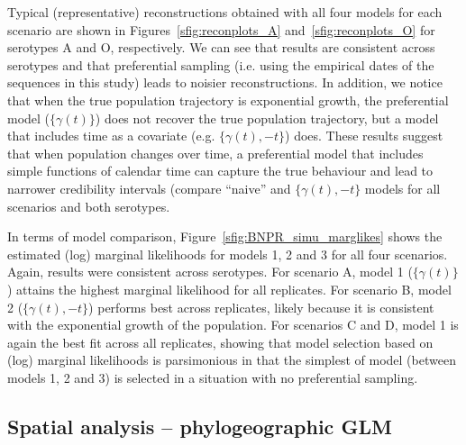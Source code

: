 \documentclass[a4paper,10pt]{article}
\begin{document}
Typical (representative) reconstructions obtained with all four models for each scenario are shown in Figures~\ref{sfig:reconplots_A} and~\ref{sfig:reconplots_O} for serotypes A and O, respectively.
We can see that results are consistent across serotypes and that preferential sampling (i.e. using the empirical dates of the sequences in this study) leads to noisier reconstructions.
In addition, we notice that when the true population trajectory is exponential growth, the preferential model ($\{\gamma(t)\}$) does not recover the true population trajectory, but a model that includes time as a covariate (e.g. $\{\gamma(t), -t\}$) does.
These results suggest that when population changes over time, a preferential model that includes simple functions of calendar time can capture the true behaviour and lead to narrower credibility intervals (compare ``naive'' and $\{\gamma(t), -t\}$ models for all scenarios and both serotypes.

In terms of model comparison, Figure~\ref{sfig:BNPR_simu_marglikes} shows the estimated (log) marginal likelihoods for models 1, 2 and 3 for all four scenarios.
Again, results were consistent across serotypes. 
For scenario A, model 1 ($ \{ \gamma(t) \}$) attains the highest marginal likelihood for all replicates.
For scenario B, model 2 ($ \{ \gamma(t), -t\}$) performs best across replicates, likely because it is consistent with the exponential growth of the population.
For scenarios C and D, model 1 is again the best fit across all replicates, showing that model selection based on (log) marginal likelihoods is parsimonious in that the simplest of model (between models 1, 2 and 3) is selected in a situation with no preferential sampling.

\subsection*{Spatial analysis -- phylogeographic GLM}
\end{document}
